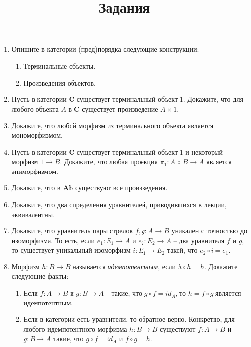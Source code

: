 \documentclass[draft]{article}
\newcommand{\cat}[1]{\mathbf{#1}}
\renewcommand{\C}{\cat{C}}
\newcommand{\Ab}{\cat{Ab}}
\begin{document}
\title{Задания}
\maketitle

\begin{enumerate}

\item Опишите в категории (пред)порядка следующие конструкции:
\begin{enumerate}
\item Терминальные объекты.
\item Произведения объектов.
\end{enumerate}

\item Пусть в категории $\C$ существует терминальный объект 1.
Докажите, что для любого объекта $A$ в $\C$ существует произведение $A \times 1$.

\item Докажите, что любой морфизм из терминального объекта является мономорфизмом.

\item Пусть в категории $\C$ существует терминальный объект 1 и некоторый морфизм $1 \to B$.
Докажите, что любая проекция $\pi_1 : A \times B \to A$ является эпиморфизмом.

\item Докажите, что в $\Ab$ существуют все произведения.

\item Докажите, что два определения уравнителей, приводившихся в лекции, эквивалентны.

\item Докажите, что уравнитель пары стрелок $f,g : A \to B$ уникален с точностью до изоморфизма.
То есть, если $e_1 : E_1 \to A$ и $e_2 : E_2 \to A$ -- два уравнителя $f$ и $g$, то существует уникальный изоморфизм $i : E_1 \to E_2$ такой, что $e_2 \circ i = e_1$.

\item Морфизм $h : B \to B$ называется \emph{идемпотентным}, если $h \circ h = h$.
Докажите следующие факты:
\begin{enumerate}
\item Если $f : A \to B$ и $g : B \to A$ -- такие, что $g \circ f = id_A$, то $h = f \circ g$ является идемпотентным.
\item Если в категории есть уравнители, то обратное верно.
Конкретно, для любого идемпотентного морфизма $h : B \to B$ существуют $f : A \to B$ и $g : B \to A$ такие, что $g \circ f = id_A$ и $f \circ g = h$.
\end{enumerate}


\end{enumerate}
\end{document}

